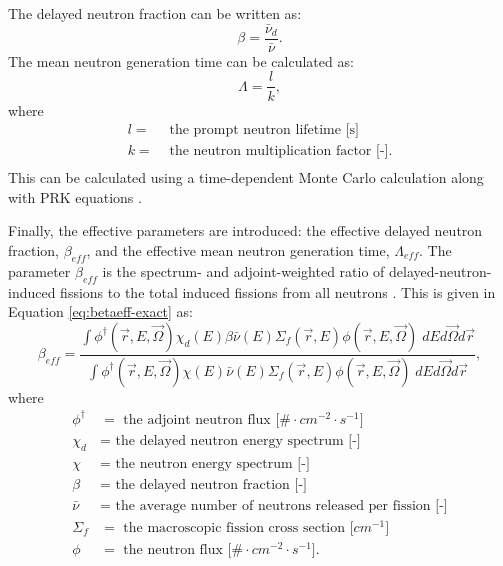 The delayed neutron fraction can be written as:
\begin{equation}
    \beta = \frac{\bar{\nu}_d}{\bar{\nu}}.
    \label{eq:beta-finalform}
\end{equation}
The mean neutron generation time can be calculated as:
\begin{equation}
    \Lambda = \frac{l}{k},
    \label{eq:lambda-sorta}
\end{equation}
where
\begin{align}
    l =& \text{ the prompt neutron lifetime [s]} \nonumber \\
    k =& \text{ the neutron multiplication factor [-].} \nonumber \\
\end{align}
This can be calculated using a time-dependent Monte Carlo calculation along with \gls{PRK} equations \cite{romero2022calculation}.



Finally, the effective parameters are introduced: the effective delayed neutron fraction, $\beta_{eff}$, and the effective mean neutron generation time, $\Lambda_{eff}$. The parameter $\beta_{eff}$ is the spectrum- and adjoint-weighted ratio of delayed-neutron-induced fissions to the total induced fissions from all neutrons \cite{romero2022calculation}.
This is given in Equation \eqref{eq:betaeff-exact} as:
\begin{equation}
    \beta_{eff} = \frac{\int \phi^\dagger(\vec{r}, E, \vec{\Omega})  \chi_d(E) \beta \bar{\nu}(E) \Sigma_f(\vec{r}, E) \phi (\vec{r}, E, \vec{\Omega}) \; dE d\vec{\Omega} d\vec{r}}{\int \phi^\dagger(\vec{r}, E, \vec{\Omega}) \chi(E) \bar{\nu}(E) \Sigma_f(\vec{r}, E) \phi (\vec{r}, E, \vec{\Omega}) \; dE d\vec{\Omega} d\vec{r}},
    \label{eq:betaeff-exact}
\end{equation}
where
\begin{align}
\phi^\dagger &= \mbox{ the adjoint neutron flux [$\# \cdot cm^{-2} \cdot s^{-1}$]} \nonumber \\ 
\chi_d &= \mbox{ the delayed neutron energy spectrum [-]} \nonumber \\ 
\chi &= \mbox{ the neutron energy spectrum [-]} \nonumber \\ 
\beta &= \mbox{ the delayed neutron fraction [-]} \nonumber \\ 
\bar{\nu} &= \mbox{ the average number of neutrons released per fission [-]} \nonumber \\ 
\Sigma_f &= \mbox{ the macroscopic fission cross section [$cm^{-1}$]} \nonumber \\
\phi &= \mbox{ the neutron flux [$\# \cdot cm^{-2} \cdot s^{-1}$].} \nonumber
\end{align}


